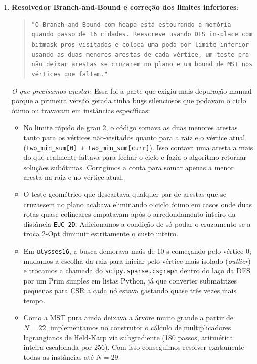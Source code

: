 \documentclass[12pt]{article}
\begin{document}
\begin{enumerate}
  \item \textbf{Resolvedor Branch-and-Bound e correção dos limites inferiores}:
  \begin{quote}
  \small\texttt{"O Branch-and-Bound com heapq está estourando a memória quando passo de 16 cidades. Reescreve usando DFS in-place com bitmask pros visitados e coloca uma poda por limite inferior usando as duas menores arestas de cada vértice, um teste pra não deixar arestas se cruzarem no plano e um bound de MST nos vértices que faltam."}
  \end{quote}
  \textit{O que precisamos ajustar}: Essa foi a parte que exigiu mais depuração manual porque a primeira versão gerada tinha bugs silenciosos que podavam o ciclo ótimo ou travavam em instâncias específicas:
  \begin{itemize}
    \item No limite rápido de grau 2, o código somava as duas menores arestas tanto para os vértices não-visitados quanto para a raiz e o vértice atual (\texttt{two\_min\_sum[0] + two\_min\_sum[curr]}). Isso contava uma aresta a mais do que realmente faltava para fechar o ciclo e fazia o algoritmo retornar soluções subótimas. Corrigimos a conta para somar apenas a menor aresta na raiz e no vértice atual.
    \item O teste geométrico que descartava qualquer par de arestas que se cruzassem no plano acabava eliminando o ciclo ótimo em casos onde duas rotas quase colineares empatavam após o arredondamento inteiro da distância \texttt{EUC\_2D}. Adicionamos a condição de só podar o cruzamento se a troca 2-Opt diminuir estritamente o custo inteiro.
    \item Em \texttt{ulysses16}, a busca demorava mais de 10 s começando pelo vértice 0; mudamos a escolha da raiz para iniciar pelo vértice mais isolado (\textit{outlier}) e trocamos a chamada do \texttt{scipy.sparse.csgraph} dentro do laço da DFS por um Prim simples em listas Python, já que converter submatrizes pequenas para CSR a cada nó estava gastando quase três vezes mais tempo.
    \item Como a MST pura ainda deixava a árvore muito grande a partir de $N=22$, implementamos no construtor o cálculo de multiplicadores lagrangianos de Held-Karp via subgradiente (180 passos, aritmética inteira escalonada por 256). Com isso conseguimos resolver exatamente todas as instâncias até $N=29$.
  \end{itemize}


\end{enumerate}
\end{document}
